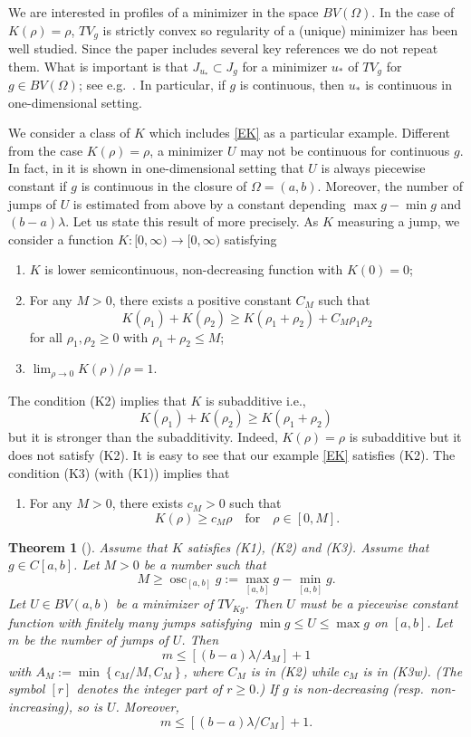 \documentclass[12pt, reqno]{amsart}
\numberwithin{equation}{section}
\newtheorem{thm}{Theorem}[section]
\DeclareMathOperator*{\osc}{osc}
\begin{document}
We are interested in profiles of a minimizer in the space $BV(\Omega)$.
 In the case of $K(\rho)=\rho$, $TV_g$ is strictly convex so regularity of a (unique) minimizer has been well studied.
 Since the paper \cite{GKKOS} includes several key references we do not repeat them.
 What is important is that $J_{u_*}\subset J_g$ for a minimizer $u_*$ of $TV_g$ for $g\in BV(\Omega)$; 
 see e.g.\ \cite{CL}.
 In particular, if $g$ is continuous, then $u_*$ is continuous in one-dimensional setting.

We consider a class of $K$ which includes \eqref{EK} as a particular example.
 Different from the case $K(\rho)=\rho$, a minimizer $U$ may not be continuous for continuous $g$.
 In fact, in \cite{GKKOS} it is shown in one-dimensional setting that $U$ is always piecewise constant if $g$ is continuous in the closure of $\Omega=(a,b)$.
 Moreover, the number of jumps of $U$ is estimated from above by a constant depending $\max g-\min g$ and $(b-a)\lambda$.
 Let us state this result of \cite{GKKOS} more precisely.
 As $K$ measuring a jump, we consider a function $K:[0,\infty)\to[0,\infty)$ satisfying
\begin{enumerate}
\item[(K1)] 
$K$ is lower semicontinuous, non-decreasing function with $K(0)=0$;
\item[(K2)] 
For any $M>0$, there exists a positive constant $C_M$ such that
\[
	K(\rho_1) + K(\rho_2) \ge K(\rho_1 + \rho_2) + C_M \rho_1 \rho_2
\]
for all $\rho_1,\rho_2\ge0$ with $\rho_1+\rho_2\le M$;
\item[(K3)] 
$\lim_{\rho\to0}K(\rho)/\rho=1$.
\end{enumerate}
The condition (K2) implies that $K$ is subadditive i.e.,
\[
	K(\rho_1) + K(\rho_2) \ge K(\rho_1 + \rho_2)
\]
but it is stronger than the subadditivity.
 Indeed, $K(\rho)=\rho$ is subadditive but it does not satisfy (K2).
 It is easy to see that our example \eqref{EK} satisfies (K2).
 The condition (K3) (with (K1)) implies that
\begin{enumerate}
\item[(K3w)] 
For any $M>0$, there exists $c_M>0$ such that
\[
	K(\rho) \ge c_M \rho
	\quad\text{for}\quad \rho \in [0, M].
\]
\end{enumerate} 
%
\begin{thm}[\cite{GKKOS}] \label{TEJ}
Assume that $K$ satisfies (K1), (K2) and (K3).
 Assume that $g\in C[a,b]$.
 Let $M>0$ be a number such that
\[
	M \ge \osc_{[a,b]} g
	:= \max_{[a,b]} g - \min_{[a,b]} g.
\]
Let $U\in BV(a,b)$ be a minimizer of $TV_{Kg}$.
 Then $U$ must be a piecewise constant function with finitely many jumps satisfying $\min g\le U\le\max g$ on $[a,b]$.
 Let $m$ be the number of jumps of $U$.
 Then
\[
	m \le \left[ (b-a) \lambda / A_M \right] + 1
\]
with $A_M:=\min\left\{ c_M / M, C_M \right\}$, where $C_M$ is in (K2) while $c_M$ is in (K3w).
 (The symbol $[r]$ denotes the integer part of $r\ge0$.)
 If $g$ is non-decreasing (resp.\ non-increasing), so is $U$.
 Moreover,
\[
	m \le \left[ (b-a) \lambda / C_M \right] + 1.
\]
\end{thm} 
\end{document}
